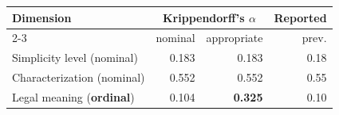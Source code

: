 \begin{tabular}{lrrr}
\toprule
Dimension & \multicolumn{2}{c}{Krippendorff's $\alpha$} & Reported \\
\cmidrule(lr){2-3}
 & nominal & appropriate & prev. \\
\midrule
Simplicity level (nominal) & 0.183 & 0.183 & 0.18 \\
Characterization (nominal) & 0.552 & 0.552 & 0.55 \\
Legal meaning (\textbf{ordinal}) & 0.104 & \textbf{0.325} & 0.10 \\
\bottomrule
\end{tabular}